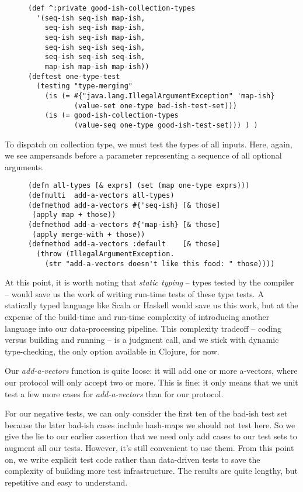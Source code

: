 \documentclass[11pt]{article}
\begin{document}
\begin{figure}[H]
\label{one-type-test}
\begin{verbatim}
(def ^:private good-ish-collection-types
  '(seq-ish seq-ish map-ish,
    seq-ish seq-ish map-ish,
    seq-ish seq-ish map-ish,
    seq-ish seq-ish seq-ish,
    seq-ish seq-ish seq-ish,
    map-ish map-ish map-ish))
(deftest one-type-test
  (testing "type-merging"
    (is (= #{"java.lang.IllegalArgumentException" 'map-ish}
           (value-set one-type bad-ish-test-set)))
    (is (= good-ish-collection-types
           (value-seq one-type good-ish-test-set))) ) )
\end{verbatim}
\end{figure}

To dispatch on collection type, we must test the types of all
inputs. Here, again, we see ampersands before a parameter
representing a sequence of all optional arguments.

\begin{figure}[H]
\label{add-a-vectors}
\begin{verbatim}
(defn all-types [& exprs] (set (map one-type exprs)))
(defmulti  add-a-vectors all-types)
(defmethod add-a-vectors #{'seq-ish} [& those]
 (apply map + those))
(defmethod add-a-vectors #{'map-ish} [& those]
 (apply merge-with + those))
(defmethod add-a-vectors :default    [& those]
  (throw (IllegalArgumentException.
    (str "add-a-vectors doesn't like this food: " those))))
\end{verbatim}
\end{figure}

At this point, it is worth noting that \emph{static typing} -- types
tested by the compiler -- would save us the work of writing run-time
tests of these type tests. A statically typed language like Scala or
Haskell would save us this work, but at the expense of the build-time
and run-time complexity of introducing another language into our
data-processing pipeline. This complexity tradeoff -- coding versus
building and running -- is a judgment call, and we stick with dynamic
type-checking, the only option available in Clojure, for now.

Our \emph{add-a-vectors} function is quite loose: it will add one or more
a-vectors, where our protocol will only accept two or more. This is
fine: it only means that we unit test a few more cases for
\emph{add-a-vectors} than for our protocol.

For our negative tests, we can only consider the first ten of the
bad-ish test set because the later bad-ish cases include hash-maps we
should not test here.  So we give the lie to our earlier assertion
that we need only add cases to our test sets to augment all our
tests. However, it's still convenient to use them. From this point
on, we write explicit test code rather than data-driven tests to save
the complexity of building more test infrastructure. The results are
quite lengthy, but repetitive and easy to understand.
\end{document}
